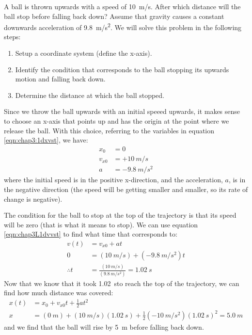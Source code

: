 \begin{example}{A ball is thrown upwards with a speed of \SI{10}{m/s}. After which distance will the ball stop before falling back down? Assume that gravity causes a constant downwards acceleration of \SI{9.8}{m/s^2}.}
\label{ex:chap3:ballupandown}
We will solve this problem in the following steps:
\begin{enumerate}[topsep=-10pt]
\item Setup a coordinate system (define the x-axis).
\item Identify the condition that corresponds to the ball stopping its upwards motion and falling back down.
\item Determine the distance at which the ball stopped.
\end{enumerate}
Since we throw the ball upwards with an initial speeed upwards, it makes sense to choose an x-axis that points up and has the origin at the point where we release the ball. With this choice, referring to the variables in equation \ref{eqn:chap3:1dxvst}, we have:
\begin{align*}
x_0&=0\\
v_{x0}&=+\SI{10}{m/s}\\
a&=\SI{-9.8}{m/s^2}
\end{align*}
where the initial speed is in the positive x-direction, and the acceleration, $a$, is in the negative direction (the speed will be getting smaller and smaller, so its rate of change is negative).

The condition for the ball to stop at the top of the trajectory is that its speed will be zero (that is what it means to stop). We can use equation \ref{eqn:chap3L1dvvst} to find what time that corresponds to:
\begin{align*}
v(t) &= v_{x0}+at\\
0 &= (\SI{10}{m/s}) + (\SI{-9.8}{m/s^2})t\\
\therefore t&=\frac{(\SI{10}{m/s})}{(\SI{9.8}{m/s^2})}=\SI{1.02}{s}
\end{align*}
Now that we know that it took \SI{1.02}{s}to reach the top of the trajectory, we can find how much distance was covered:
\begin{align*}
x(t) &= x_0+v_{x0}t+ \frac{1}{2}at^2\\
x &= (\SI{0}{m})+(\SI{10}{m/s})(\SI{1.02}{s})+\frac{1}{2}(\SI{-10}{m/s^2})(\SI{1.02}{s})^2 = \SI{5.0}{m}
\end{align*}
and we find that the ball will rise by \SI{5}{m} before falling back down. 
\end{example}

